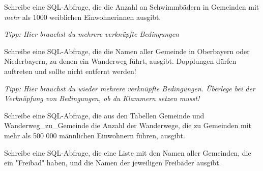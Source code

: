 \vspace{0.3cm}


Schreibe eine SQL-Abfrage, die die Anzahl an Schwimmbädern in Gemeinden mit \emph{mehr} als 1000 weiblichen Einwohnerinnen ausgibt.

\emph{Tipp: Hier brauchst du mehrere verknüpfte Bedingungen}





\vspace{0.3cm}


Schreibe eine SQL-Abfrage, die die Namen aller Gemeinde in Oberbayern oder Niederbayern, zu denen ein Wanderweg führt, ausgibt. Dopplungen dürfen auftreten und sollte nicht entfernt werden!

\emph{Tipp: Hier brauchst du wieder mehrere verknüpfte Bedingungen. Überlege bei der Verknüpfung von Bedingungen, ob du Klammern setzen musst!}



\vspace{0.3cm}


Schreibe eine SQL-Abfrage, die aus den Tabellen Gemeinde und Wanderweg\_zu\_Gemeinde die Anzahl der Wanderwege, die zu Gemeinden mit mehr als 500 000 männlichen Einwohnern führen, ausgibt.




\vspace{0.3cm}


Schreibe eine SQL-Abfrage, die eine Liste mit den Namen aller Gemeinden, die ein "Freibad" haben, und die Namen der jeweiligen Freibäder ausgibt. 

